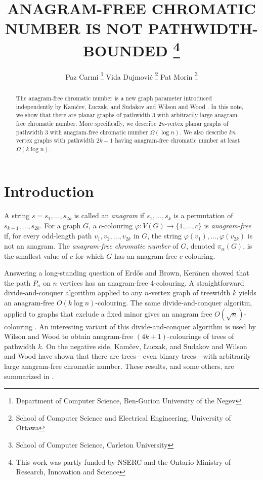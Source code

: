 \documentclass{patmorin}
\title{\MakeUppercase{Anagram-Free Chromatic Number is not Pathwidth-Bounded}%
   \thanks{This work was partly funded by NSERC and the Ontario Ministry of
    Research, Innovation and Science}}
\author{Paz Carmi%
   \thanks{Department of Computer Science,
           Ben-Gurion University of the Negev}\quad%
   Vida Dujmović%
   \thanks{School of Computer Science and Electrical Engineering, 
           University of Ottawa}\quad%
   Pat Morin%
   \thanks{School of Computer Science, Carleton University}}%
\begin{document}
\maketitle
%
\begin{abstract}
  The anagram-free chromatic number is a new graph parameter
  introduced independently by Kamčev, Łuczak, and Sudakov
  \cite{kamcev.luczak.ea:anagram-free} and Wilson and Wood
  \cite{wilson.wood:anagram-free}.  In this note, we show that there
  are planar graphs of pathwidth 3 with arbitrarily large anagram-free
  chromatic number.  More specifically, we describe $2n$-vertex planar
  graphs of pathwidth 3 with anagram-free chromatic number $\Omega(\log n)$.
  We also describe $kn$ vertex graphs with pathwidth $2k-1$ having
  anagram-free chromatic number at least $\Omega(k\log n)$.
\end{abstract}
%
%


\section{Introduction}

A string $s=s_1,\ldots,s_{2k}$ is called an \emph{anagram} if
$s_1,\ldots,s_k$ is a permutation of $s_{k+1},\ldots,s_{2k}$.
For a graph $G$, a $c$-colouring $\varphi:V(G)\to\{1,\ldots,c\}$ is
\emph{anagram-free} if, for every odd-length path $v_1,v_2,\ldots,v_{2k}$
in $G$, the string $\varphi(v_1),\ldots,\varphi(v_{2k})$ is not an
anagram.  The \emph{anagram-free chromatic number} of $G$, denoted
$\pi_\alpha(G)$, is the smallest value of $c$ for which $G$ has an
anagram-free $c$-colouring.

Answering a long-standing question of Erd\H{o}s and Brown, Ker\"anen
\cite{keranen:abelian} showed that the path $P_n$ on $n$ vertices has an
anagram-free 4-colouring.  A straightforward divide-and-conquer
algorithm applied to any $n$-vertex graph of treewidth $k$ yields
an anagram-free $O(k\log n)$-colouring.  The same divide-and-conquer
algoritm, applied to graphs that exclude a fixed minor gives an anagram
free $O(\sqrt{n})$-colouring \cite{kamcev.luczak.ea:anagram-free}.
An interesting variant of this divide-and-conquer algorithm is used by
Wilson and Wood \cite{wilson.wood:anagram-free} to obtain anagram-free
$(4k+1)$-colourings of trees of pathwidth $k$.  On the negative side,
Kamčev, Łuczak, and Sudakov \cite{kamcev.luczak.ea:anagram-free} and
Wilson and Wood \cite{wilson.wood:anagram-free} have shown that there
are trees---even binary trees---with arbitrarily large anagram-free
chromatic number.  These results, and some others, are summarized in
.
\end{document}
